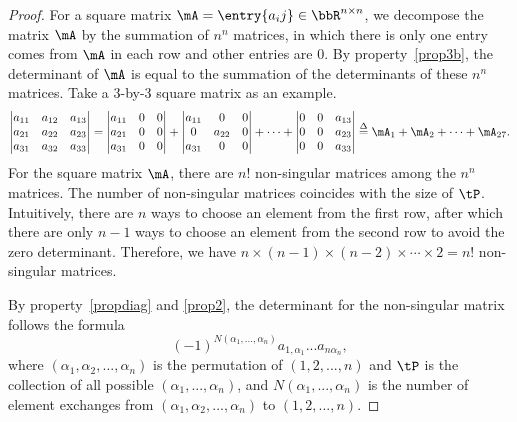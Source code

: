 \documentclass[11pt]{article}
\theoremstyle{plain}
\theoremstyle{definition}
\begin{document}
\begin{proof}
	For a square matrix $\mA = \entry{a_ij} \in \bbR^{n \times n}$, we decompose the  matrix $\mA$ by the summation of $n^n$ matrices, in which there is only one entry comes from $\mA$ in each row and other entries are 0. By property~\ref{prop3b}, the determinant of $\mA$ is equal to the summation of the determinants of these $n^n$ matrices. Take a 3-by-3 square matrix as an example.
	\begin{align}
		\begin{vmatrix}
			a_{11} & a_{12} & a_{13}\\
			a_{21} & a_{22} & a_{23}\\
			a_{31} & a_{32} & a_{33}
		\end{vmatrix} = \begin{vmatrix}
			a_{11} & 0& 0\\
			a_{21} & 0 & 0\\
			a_{31} &0 & 0
		\end{vmatrix} + \begin{vmatrix}
			a_{11} & 0& 0\\
			0 & a_{22} & 0\\
			a_{31} &0 & 0
		\end{vmatrix} + \cdots +\begin{vmatrix}
			0 & 0& a_{13}\\
			0& 0 & a_{23}\\
			 0&0 & a_{33}
		\end{vmatrix} \overset{\Delta}{=} \mA_1 + \mA_2 +\cdots + \mA_{27}.
	\end{align}
	For the square matrix $\mA$,  there are $n!$ non-singular matrices among the $n^n$ matrices. The number of non-singular matrices coincides with the size of $\tP$. Intuitively, there are $n$ ways to choose an element from the first row, after which there are only $n-1$ ways to choose an element from the second row to avoid the zero determinant. Therefore, we have $n \times (n-1) \times (n-2) \times \cdots \times 2 = n!$ non-singular matrices.
	
	By property~\ref{propdiag} and \ref{prop2}, the determinant for the non-singular matrix follows the formula \[(-1)^{N(\alpha_1,...,\alpha_n)}  a_{1,\alpha_1} ... a_{n \alpha_n},\]
	where $(\alpha_1, \alpha_2, ...,\alpha_n)$ is the permutation of $(1,2,...,n)$ and $\tP$ is the collection of all possible  $(\alpha_1,...,\alpha_n)$, and $N(\alpha_1,...,\alpha_n)$ is the number of element exchanges from $(\alpha_1,\alpha_2,...,\alpha_n)$  to $(1,2,...,n)$. 
\end{proof}
\end{document}
